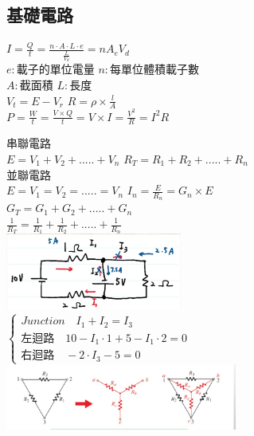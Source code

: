 \documentclass[a4paper,10pt,twocolumn,oneside]{article}
\begin{document}
\begin{normalsize}
\subsection{基礎電路}
$I=\frac{Q}{t}=\frac{n \cdot A \cdot L \cdot e}{\frac{L}{V_{d}}}=nA_{e}V_{d}$\\
$ e:載子的單位電量$ $n:每單位體積載子數$\\$A:截面積$ $L:長度$\\
$ V_{t}=E-V_{r} $ \quad $ R=\rho \times \frac{l}{A}$\\ 
$ P=\frac{W}{t}=\frac{V \times Q}{t}=V\times I=\frac{V^2}{R}=I^2 R$ 

串聯電路 \\
$ E=V_{1}+V_{2}+.....+V_{n}$ \quad
$ R_{T}=R_{1}+R_{2}+.....+R_{n}$ \\ 
並聯電路 \\
$ E=V_{1}=V_{2}=.....=V_{n}$ \quad
$ I_{n}=\frac{E}{R_{n}}=G_{n}\times E$ \\ 
$ G_{T}=G_{1}+G_{2}+.....+G_{n}$ \\
$ \frac{1}{R_{T}}=\frac{1}{R_{1}}+\frac{1}{R_{2}}+.....+\frac{1}{R_{n}}$ \\ 
\includegraphics[height=1in]{kirchhoff.jpg}\\
$
\left\{
\begin{array}{l}
Junction \quad  I_{1}+I_{2}=I_{3}\\
左迴路 \quad  10-I_{1}\cdot 1+5-I_{1} \cdot 2 =0\\
右迴路 \quad -2 \cdot I_{3}-5=0
\end{array}
\right .
$ \\
\includegraphics[width=3in]{TriangleCircuit.jpg} \\

\end{normalsize}
\end{document}
